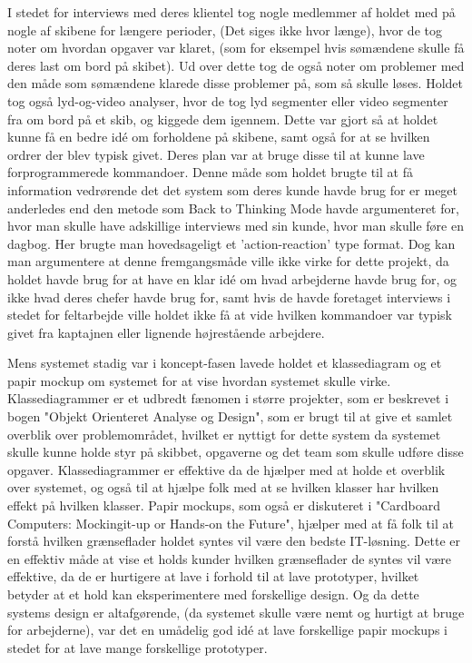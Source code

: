 \documentclass[10pt,a4paper,danish]{article}
\begin{document}
I stedet for interviews med deres klientel tog nogle medlemmer af holdet med på nogle af skibene for længere perioder, 
(Det siges ikke hvor længe), hvor de tog noter om hvordan opgaver var klaret, (som for eksempel hvis sømændene skulle 
få deres last om bord på skibet). Ud over dette tog de også noter om problemer med den måde som sømændene klarede 
disse problemer på, som så skulle løses. Holdet tog også lyd-og-video analyser, hvor de tog lyd segmenter eller 
video segmenter fra om bord på et skib, og kiggede dem igennem. Dette var gjort så at holdet kunne få en bedre 
idé om forholdene på skibene, samt også for at se hvilken ordrer der blev typisk givet. Deres plan var at bruge disse 
til at kunne lave forprogrammerede kommandoer. Denne måde som holdet brugte til at få information vedrørende det 
det system som deres kunde havde brug for er meget anderledes end den metode som Back to Thinking Mode havde 
argumenteret for, hvor man skulle have adskillige interviews med sin kunde, hvor man skulle føre en dagbog. Her brugte 
man hovedsageligt et 'action-reaction' type format. Dog kan man argumentere at denne fremgangsmåde 
ville ikke virke for dette projekt, da holdet havde brug for at have en klar idé om hvad arbejderne havde brug for, og 
ikke hvad deres chefer havde brug for, samt hvis de havde foretaget interviews i stedet for feltarbejde ville holdet ikke 
få at vide hvilken kommandoer var typisk givet fra kaptajnen eller lignende højrestående arbejdere.

Mens systemet stadig var i koncept-fasen lavede holdet et klassediagram og et papir mockup om systemet for at vise 
hvordan systemet skulle virke. Klassediagrammer er et udbredt fænomen i større projekter, som er beskrevet i bogen 
"Objekt Orienteret Analyse og Design", som er brugt til at give et samlet overblik over problemområdet, hvilket 
er nyttigt for dette system da systemet skulle kunne holde styr på skibbet, opgaverne og det team som skulle 
udføre disse opgaver. Klassediagrammer er effektive da de hjælper med at holde et overblik over systemet, og 
også til at hjælpe folk med at se hvilken klasser har hvilken effekt på hvilken klasser. Papir mockups, som også 
er diskuteret i "Cardboard Computers: Mockingit-up or Hands-on the Future", hjælper med at få folk til at forstå 
hvilken grænseflader holdet syntes vil være den bedste IT-løsning. Dette er en effektiv måde at vise et holds kunder 
hvilken grænseflader de syntes vil være effektive, da de er hurtigere at lave i forhold til at lave prototyper, hvilket 
betyder at et hold kan eksperimentere med forskellige design. Og da dette systems design er altafgørende, (da systemet 
skulle være nemt og hurtigt at bruge for arbejderne), var det en umådelig god idé at lave forskellige papir mockups i stedet 
for at lave mange forskellige prototyper.
\end{document}
